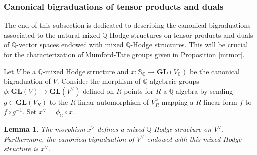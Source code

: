 \documentclass[10pt]{article}
\numberwithin{equation}{subsection}
\theoremstyle{plain}
\newtheorem{lemma}[theorem]{Lemma}
\theoremstyle{definition}
\theoremstyle{remark}
\newcommand{\Q}{\mathbb Q}
\newcommand{\C}{\mathbb C}
\newcommand{\s}{\mathbb S}
\newcommand{\gl}{\mathbf{GL}}
\begin{document}
\subsubsection*{Canonical bigraduations of tensor products and duals}
The end of this subsection is dedicated to describing the canonical bigraduations associated to the natural mixed $\Q$-Hodge structures on tensor products and duals of $\Q$-vector spaces endowed with mixed $\Q$-Hodge structures. This will be crucial for the characterization of Mumford-Tate groups given in Proposition \ref{mtmor}. 

Let $V$ be a $\Q$-mixed Hodge structure and $x : \s_\C \rightarrow \gl(V_\C)$ be the canonical bigraduation of $V$. Consider the morphism of $\Q$-algebraic groups $\phi : \gl(V) \rightarrow \gl(V^\vee)$ defined on $R$-points for $R$ a $\Q$-algebra by sending $g \in \gl(V_R)$ to the $R$-linear automorphism of $V_R^\vee$ mapping a $R$-linear form $f$ to $f \circ g^{-1}$. Set $x^\vee = \phi_\C \circ x$.
\begin{lemma}\label{dual}
The morphism $x^\vee$ defines a mixed $\Q$-Hodge structure on $V^\vee$. Furthermore, the canonical bigraduation of $V^\vee$ endowed with this mixed Hodge structure is $x^\vee$.
\end{lemma} 
\end{document}
